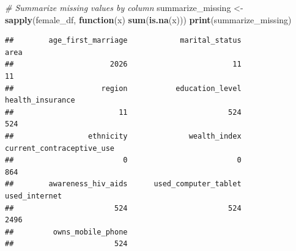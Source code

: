 \documentclass[
]{article}
\newenvironment{Shaded}{\begin{snugshade}}{\end{snugshade}}
\newcommand{\CommentTok}[1]{\textcolor[rgb]{0.56,0.35,0.01}{\textit{#1}}}
\newcommand{\ControlFlowTok}[1]{\textcolor[rgb]{0.13,0.29,0.53}{\textbf{#1}}}
\newcommand{\FunctionTok}[1]{\textcolor[rgb]{0.13,0.29,0.53}{\textbf{#1}}}
\newcommand{\NormalTok}[1]{#1}
\newcommand{\OtherTok}[1]{\textcolor[rgb]{0.56,0.35,0.01}{#1}}
\begin{document}
\begin{Shaded}
\begin{Highlighting}[]
\CommentTok{\# Summarize missing values by column}
\NormalTok{summarize\_missing }\OtherTok{\textless{}{-}} \FunctionTok{sapply}\NormalTok{(female\_df, }\ControlFlowTok{function}\NormalTok{(x) }\FunctionTok{sum}\NormalTok{(}\FunctionTok{is.na}\NormalTok{(x)))}
\FunctionTok{print}\NormalTok{(summarize\_missing)}
\end{Highlighting}
\end{Shaded}

\begin{verbatim}
##        age_first_marriage            marital_status                      area 
##                      2026                        11                        11 
##                    region           education_level          health_insurance 
##                        11                       524                       524 
##                 ethnicity              wealth_index current_contraceptive_use 
##                         0                         0                       864 
##        awareness_hiv_aids      used_computer_tablet             used_internet 
##                       524                       524                      2496 
##         owns_mobile_phone 
##                       524
\end{verbatim}
\end{document}
